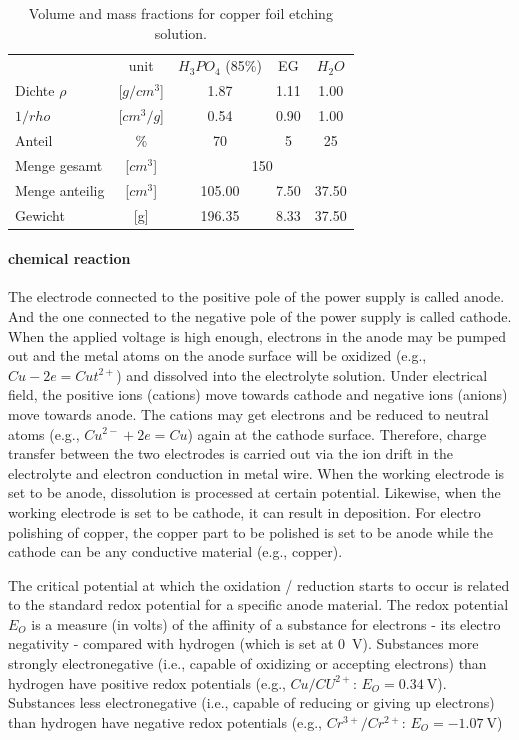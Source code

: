 \begin{table}
	\centering
	\caption{Volume and mass fractions for copper foil etching solution.}
	\begin{tabular}{lcccc}
		&unit	&$H_3PO_4$ (85\%)&	EG	&	$H_2O$	\\
		Dichte $\rho$   &[$g/cm^3$]	&	1.87	&	1.11	&	1.00	\\
		$1/rho$		&[$cm^3/g$]	&	0.54	&	0.90	&	1.00	\\
		Anteil 		& \%		&	70	&	5	&	25	\\ \hline
		Menge gesamt    &[$cm^3$]	&		\multicolumn{3}{c}{150} 	\\
		Menge anteilig  &[$cm^3$]	&	105.00	&	7.50	&	37.50	\\
		Gewicht         &[g]		&	196.35	&	8.33	&	37.50	\\
	\end{tabular}
	\label{tab:used-etching-solution}
\end{table}

\paragraph{chemical reaction}
The electrode connected to the positive pole of the power supply is called anode. And the one connected to the negative pole of the power supply is called cathode. When the applied voltage is high enough, electrons in the anode may be pumped out and the metal atoms on the anode surface will be oxidized (e.g., $Cu - 2e = Cut^{2+}$) and dissolved into the electrolyte solution. Under electrical field, the positive ions (cations) move towards cathode and negative ions (anions) move towards anode. The cations may get electrons and be reduced to neutral atoms (e.g., $Cu^{2-} + 2e = Cu$) again at the cathode surface. Therefore, charge transfer between the two electrodes is carried out via the ion drift in the electrolyte and electron conduction in metal wire. When the working electrode is set to be anode, dissolution is processed at certain potential. Likewise, when the working electrode is set to be cathode, it can result in deposition. For electro polishing of copper, the copper part to be polished is set to be anode while the cathode can be any conductive material (e.g., copper).

The critical potential at which the oxidation / reduction starts to occur is related to the standard redox potential for a specific anode material. The redox potential $E_O$ is a measure (in volts) of the affinity of a substance for electrons - its electro negativity - compared with hydrogen (which is set at \SI{0}{\volt}). Substances more strongly electronegative (i.e., capable of oxidizing or accepting electrons) than hydrogen have positive redox potentials (e.g., $Cu/CU^{2+}$: $E_O = \SI{0.34}{\volt}$). Substances less electronegative (i.e., capable of reducing or giving up electrons) than hydrogen have negative redox potentials (e.g., $Cr^{3+}/Cr^{2+}$: $E_O = \SI{-1.07}{\volt}$)\cite{jinshan_electrochemical_2004}


